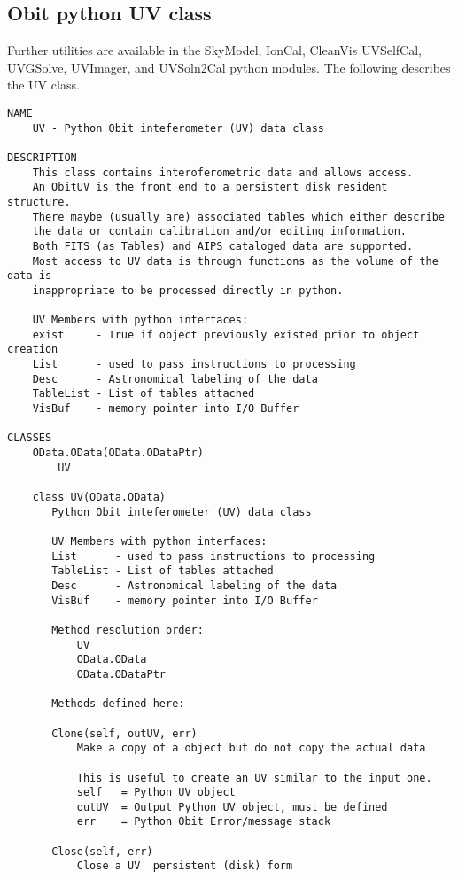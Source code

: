 \documentclass[11pt]{report}
\begin{document}
\subsection{Obit python UV class}
Further utilities are available in the SkyModel, IonCal, CleanVis
UVSelfCal, UVGSolve, UVImager, and UVSoln2Cal python modules. 
The following describes the UV class.
\begin{verbatim}
NAME
    UV - Python Obit inteferometer (UV) data class

DESCRIPTION
    This class contains interoferometric data and allows access.
    An ObitUV is the front end to a persistent disk resident structure.
    There maybe (usually are) associated tables which either describe
    the data or contain calibration and/or editing information.
    Both FITS (as Tables) and AIPS cataloged data are supported.
    Most access to UV data is through functions as the volume of the data is
    inappropriate to be processed directly in python.
    
    UV Members with python interfaces:
    exist     - True if object previously existed prior to object creation
    List      - used to pass instructions to processing
    Desc      - Astronomical labeling of the data
    TableList - List of tables attached
    VisBuf    - memory pointer into I/O Buffer

CLASSES
    OData.OData(OData.ODataPtr)
        UV
    
    class UV(OData.OData)
       Python Obit inteferometer (UV) data class
       
       UV Members with python interfaces:
       List      - used to pass instructions to processing
       TableList - List of tables attached
       Desc      - Astronomical labeling of the data
       VisBuf    - memory pointer into I/O Buffer
       
       Method resolution order:
           UV
           OData.OData
           OData.ODataPtr
       
       Methods defined here:
       
       Clone(self, outUV, err)
           Make a copy of a object but do not copy the actual data
           
           This is useful to create an UV similar to the input one.
           self   = Python UV object
           outUV  = Output Python UV object, must be defined
           err    = Python Obit Error/message stack
       
       Close(self, err)
           Close a UV  persistent (disk) form
           

\end{verbatim}
\end{document}
